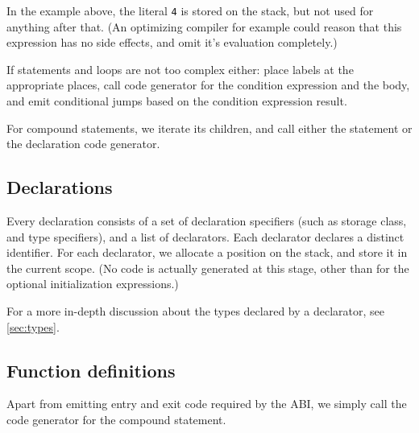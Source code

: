 \documentclass[12pt]{article}
\begin{document}

In the example above, the literal \texttt{4} is stored on the stack, but not
used for anything after that. (An optimizing compiler for example could reason
that this expression has no side effects, and omit it's evaluation completely.)

If statements and loops are not too complex either: place labels at the
appropriate places, call code generator for the condition expression and the
body, and emit conditional jumps based on the condition expression result.


For compound statements, we iterate its children, and call either the statement
or the declaration code generator.

\subsection{Declarations}
Every declaration consists of a set of declaration specifiers (such as storage
class, and type specifiers), and a list of declarators. Each declarator
declares a distinct identifier. For each declarator, we allocate a position on
the stack, and store it in the current scope. (No code is actually generated at
this stage, other than for the optional initialization expressions.)

For a more in-depth discussion about the types declared by a declarator, see
\ref{sec:types}.

\subsection{Function definitions}
Apart from emitting entry and exit code required by the ABI, we simply call the
code generator for the compound statement.
\end{document}
